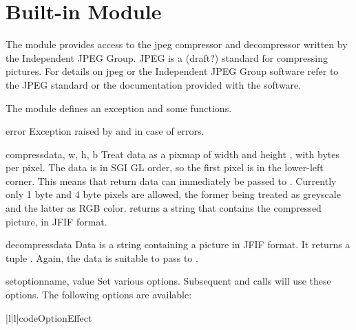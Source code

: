 \section{Built-in Module }
\label{module-jpeg}

The module  provides access to the jpeg compressor and
decompressor written by the Independent JPEG Group. JPEG is a (draft?)
standard for compressing pictures.  For details on jpeg or the
Independent JPEG Group software refer to the JPEG standard or the
documentation provided with the software.

The  module defines an exception and some functions.

\begin{excdesc}{error}
Exception raised by  and 
in case of errors.
\end{excdesc}

\begin{funcdesc}{compress}{data, w, h, b}
Treat data as a pixmap of width  and height , with
 bytes per pixel.  The data is in SGI GL order, so the first
pixel is in the lower-left corner. This means that 
return data can immediately be passed to .
Currently only 1 byte and 4 byte pixels are allowed, the former being
treated as greyscale and the latter as RGB color.
 returns a string that contains the compressed
picture, in JFIF format.
\end{funcdesc}

\begin{funcdesc}{decompress}{data}
Data is a string containing a picture in JFIF format. It returns a
tuple .  Again, the data is suitable to pass to
.
\end{funcdesc}

\begin{funcdesc}{setoption}{name, value}
Set various options.  Subsequent  and
 calls will use these options.  The following
options are available:

\begin{tableii}{|l|l|}{code}{Option}{Effect}
\end{tableii}
\end{funcdesc}
